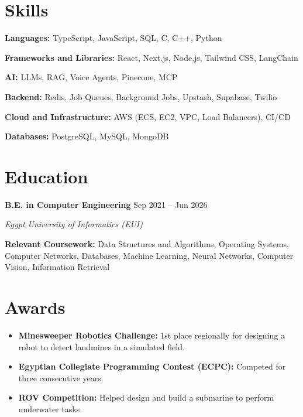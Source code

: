 \documentclass[a4paper,10pt]{article}
\newcommand{\role}[3]{\textbf{#1} \hfill #3\par\textit{#2}\par}
\begin{document}
\section{Skills}
\textbf{Languages:} TypeScript, JavaScript, SQL, C, C++, Python\par\vspace{2pt}
\textbf{Frameworks and Libraries:} React, Next.js, Node.js, Tailwind CSS, LangChain\par\vspace{2pt}
\textbf{AI:} LLMs, RAG, Voice Agents, Pinecone, MCP\par\vspace{2pt}
\textbf{Backend:} Redis, Job Queues, Background Jobs, Upstash, Supabase, Twilio\par\vspace{2pt}
\textbf{Cloud and Infrastructure:} AWS (ECS, EC2, VPC, Load Balancers), CI/CD\par\vspace{2pt}
\textbf{Databases:} PostgreSQL, MySQL, MongoDB

\section{Education}
\role{B.E. in Computer Engineering}{Egypt University of Informatics (EUI)}{Sep 2021 -- Jun 2026}
\textbf{Relevant Coursework:} Data Structures and Algorithms, Operating Systems, Computer Networks, Databases, Machine Learning, Neural Networks, Computer Vision, Information Retrieval

\section{Awards}
\begin{itemize}
    \item \textbf{Minesweeper Robotics Challenge:} 1st place regionally for designing a robot to detect landmines in a simulated field.
    \item \textbf{Egyptian Collegiate Programming Contest (ECPC):} Competed for three consecutive years.
    \item \textbf{ROV Competition:} Helped design and build a submarine to perform underwater tasks.
\end{itemize}
\end{document}
